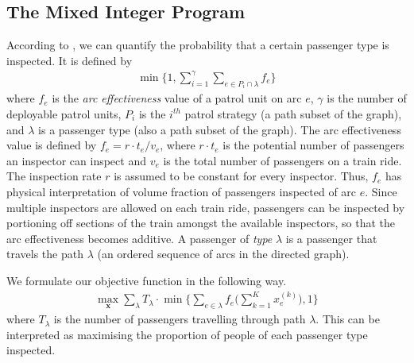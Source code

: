 \documentclass[11pt]{article}
\begin{document}
\subsection{The Mixed Integer Program}
\par According to \cite{jiang_sandholm_2012}\cite{mastersthesis}\cite{yin_sullivan_2012}, we can quantify the probability that a certain passenger type is inspected. It is defined by
\begin{align}
    \min\bigg\{1,\sum_{i=1}^\gamma\sum_{e\in P_i\cap\lambda} f_e\bigg\}
\end{align}
where $f_e$ is the \textit{arc effectiveness} value of a patrol unit on arc $e$, $\gamma$ is the number of deployable patrol units, $P_i$ is the $i^{th}$ patrol strategy (a path subset of the graph), and $\lambda$ is a passenger type (also a path subset of the graph). The arc effectiveness value is defined by $f_e = r\cdot t_e/v_e$, where $r\cdot t_e$ is the potential number of passengers an inspector can inspect and $v_e$ is the total number of passengers on a train ride. The inspection rate $r$ is assumed to be constant for every inspector. Thus, $f_e$ has physical interpretation of volume fraction of passengers inspected of arc $e$. Since multiple inspectors are allowed on each train ride, passengers can be inspected by portioning off sections of the train amongst the available inspectors, so that the arc effectiveness becomes additive. A passenger of \textit{type} $\lambda$ is a passenger that travels the path $\lambda$ (an ordered sequence of arcs in the directed graph).
\par We formulate our objective function in the following way.
\begin{align}\label{objectivefxn}
    \max_{\textbf{x}}\sum_{\lambda}T_{\lambda}\cdot\min\bigg\{\sum_{e\in\lambda}f_e\big(
        \sum_{k=1}^K x_{e}^{(k)}
    \big), 1\bigg\}
\end{align}
where $T_\lambda$ is the number of passengers travelling through path $\lambda$. This can be interpreted as maximising the proportion of people of each passenger type inspected.
\end{document}
